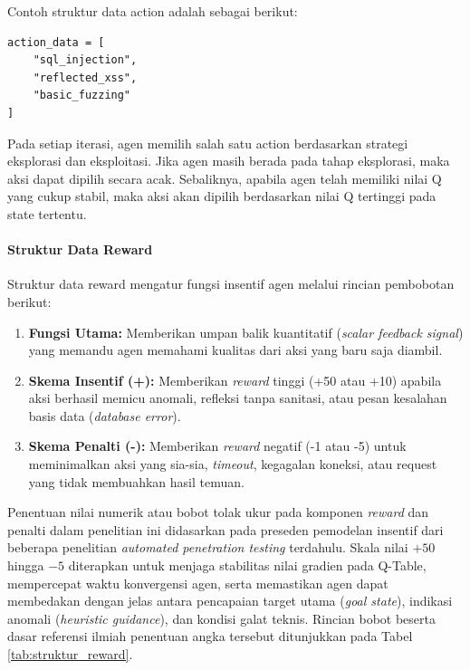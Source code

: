 Contoh struktur data action adalah sebagai berikut:

\begin{verbatim}
action_data = [
    "sql_injection",
    "reflected_xss",
    "basic_fuzzing"
]
\end{verbatim}

Pada setiap iterasi, agen memilih salah satu action berdasarkan strategi eksplorasi dan eksploitasi. Jika agen masih berada pada tahap eksplorasi, maka aksi dapat dipilih secara acak. Sebaliknya, apabila agen telah memiliki nilai Q yang cukup stabil, maka aksi akan dipilih berdasarkan nilai Q tertinggi pada state tertentu.

\paragraph{Struktur Data Reward}

Struktur data reward mengatur fungsi insentif agen melalui rincian pembobotan berikut:

\begin{enumerate}
    \item \textbf{Fungsi Utama:} Memberikan umpan balik kuantitatif (\textit{scalar feedback signal}) yang memandu agen memahami kualitas dari aksi yang baru saja diambil.
    \item \textbf{Skema Insentif (+):} Memberikan \textit{reward} tinggi (+50 atau +10) apabila aksi berhasil memicu anomali, refleksi tanpa sanitasi, atau pesan kesalahan basis data (\textit{database error}).
    \item \textbf{Skema Penalti (-):} Memberikan \textit{reward} negatif (-1 atau -5) untuk meminimalkan aksi yang sia-sia, \textit{timeout}, kegagalan koneksi, atau request yang tidak membuahkan hasil temuan.
\end{enumerate}

Penentuan nilai numerik atau bobot tolak ukur pada komponen \textit{reward} dan penalti dalam penelitian ini didasarkan pada preseden pemodelan insentif dari beberapa penelitian \textit{automated penetration testing} terdahulu. Skala nilai $+50$ hingga $-5$ diterapkan untuk menjaga stabilitas nilai gradien pada Q-Table, mempercepat waktu konvergensi agen, serta memastikan agen dapat membedakan dengan jelas antara pencapaian target utama (\textit{goal state}), indikasi anomali (\textit{heuristic guidance}), dan kondisi galat teknis. Rincian bobot beserta dasar referensi ilmiah penentuan angka tersebut ditunjukkan pada Tabel \ref{tab:struktur_reward}.

